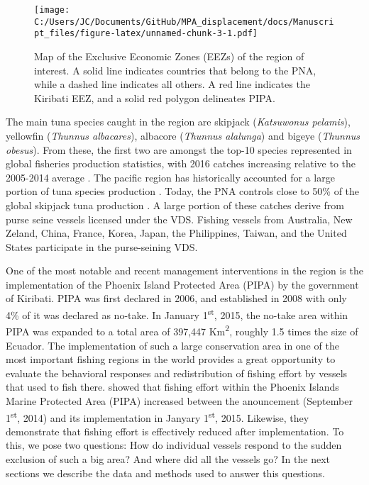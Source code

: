 \documentclass[11pt,]{article}
\begin{document}
\begin{figure}
\centering
\texttt{[image: C:/Users/JC/Documents/GitHub/MPA\_displacement/docs/Manuscript\_files/figure-latex/unnamed-chunk-3-1.pdf]}
\caption{\label{fig:unnamed-chunk-3}\label{fig:PNA_map}Map of the Exclusive
Economic Zones (EEZs) of the region of interest. A solid line indicates
countries that belong to the PNA, while a dashed line indicates all
others. A red line indicates the Kiribati EEZ, and a solid red polygon
delineates PIPA.}
\end{figure}

The main tuna species caught in the region are skipjack
(\emph{Katsuwonus pelamis}), yellowfin (\emph{Thunnus albacares}),
albacore (\emph{Thunnus alalunga}) and bigeye (\emph{Thunnus obesus}).
From these, the first two are amongst the top-10 species represented in
global fisheries production statistics, with 2016 catches increasing
relative to the 2005-2014 average \citep{fao_2018}. The pacific region
has historically accounted for a large portion of tuna species
production \citep{aqorau_1997}. Today, the PNA controls close to 50\% of
the global skipjack tuna production \citep{pna_website_2018}. A large
portion of these catches derive from purse seine vessels licensed under
the VDS. Fishing vessels from Australia, New Zeland, China, France,
Korea, Japan, the Philippines, Taiwan, and the United States participate
in the purse-seining VDS.

One of the most notable and recent management interventions in the
region is the implementation of the Phoenix Island Protected Area (PIPA)
by the government of Kiribati. PIPA was first declared in 2006, and
established in 2008 with only 4\% of it was declared as no-take. In
January 1\textsuperscript{st}, 2015, the no-take area within PIPA was
expanded to a total area of 397,447 Km\textsuperscript{2}, roughly 1.5
times the size of Ecuador. The implementation of such a large
conservation area in one of the most important fishing regions in the
world provides a great opportunity to evaluate the behavioral responses
and redistribution of fishing effort by vessels that used to fish there.
\citet{mcdermott_2018} showed that fishing effort within the Phoenix
Islands Marine Protected Area (PIPA) increased between the anouncement
(September 1\textsuperscript{st}, 2014) and its implementation in
Janyary 1\textsuperscript{st}, 2015. Likewise, they demonstrate that
fishing effort is effectively reduced after implementation. To this, we
pose two questions: How do individual vessels respond to the sudden
exclusion of such a big area? And where did all the vessels go? In the
next sections we describe the data and methods used to answer this
questions.
\end{document}
